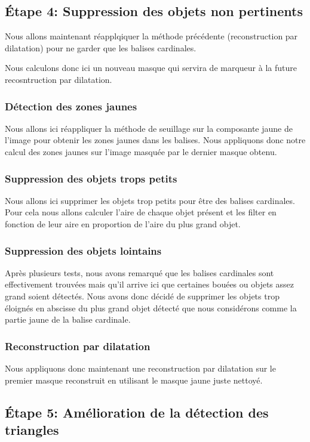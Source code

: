 \documentclass{article}
\begin{document}
\subsection{Étape 4: Suppression des objets non pertinents}

Nous allons maintenant réapplqiquer la méthode précédente (reconstruction par
dilatation) pour ne garder que les balises cardinales.

Nous calculons donc ici un nouveau masque qui servira de marqueur à la future
recosntruction par dilatation.

\subsubsection{Détection des zones jaunes}
Nous allons ici réappliquer la méthode de seuillage sur la composante jaune de
l'image pour obtenir les zones jaunes dans les balises. Nous appliquons donc
notre calcul des zones jaunes sur l'image masquée par le dernier masque obtenu.

\subsubsection{Suppression des objets trops petits}
Nous allons ici supprimer les objets trop petits pour être des balises
cardinales. Pour cela nous allons calculer l'aire de chaque objet présent et
les filter en fonction de leur aire en proportion de l'aire du plus grand
objet.

\subsubsection{Suppression des objets lointains}
Après plusieurs tests, nous avons remarqué que les balises cardinales sont
effectivement trouvées mais qu'il arrive ici que certaines bouées ou objets
assez grand soient détectés. Nous avons donc décidé de supprimer les objets
trop éloignés en abscisse du plus grand objet détecté que nous considérons
comme la partie jaune de la balise cardinale.

\subsubsection{Reconstruction par dilatation}

Nous appliquons donc maintenant une reconstruction par dilatation sur le
premier masque reconstruit en utilisant le masque jaune juste nettoyé.

\subsection{Étape 5: Amélioration de la détection des triangles}
\end{document}
